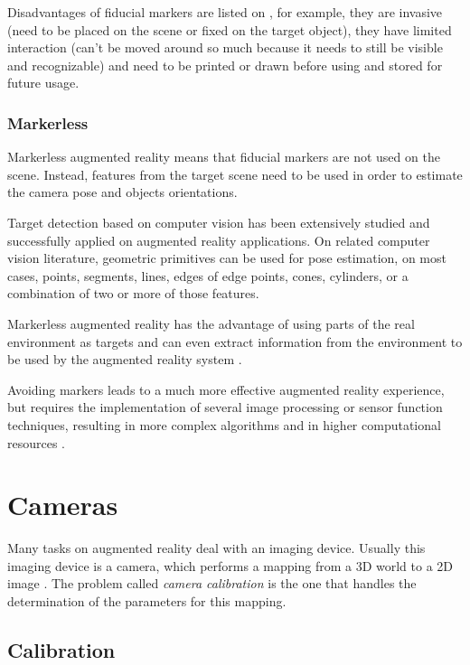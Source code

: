 \documentclass[msc, a4paper, classic, en]{ufbathesis}
\begin{document}
Disadvantages of fiducial markers are listed on \cite{dolz}, for example, they are invasive (need to be placed on the scene or fixed on the target object), they have limited interaction (can't be moved around so much because it needs to still be visible and recognizable) and need to be printed or drawn before using and stored for future usage.

\subsubsection{Markerless}

Markerless augmented reality means that fiducial markers are not used on the scene. Instead, features from the target scene need to be used in order to estimate the camera pose and objects orientations.

Target detection based on computer vision has been extensively studied and successfully applied on augmented reality applications. On related computer vision literature, geometric primitives can be used for pose estimation, on most cases, points, segments, lines, edges of edge points, cones, cylinders, or a combination of two or more of those features.

Markerless augmented reality has the advantage of using parts of the real environment as targets and can even extract information from the environment to be used by the augmented reality system \cite{dolz}.

Avoiding markers leads to a much more effective augmented reality experience, but requires the implementation of several image processing or sensor function techniques, resulting in more complex algorithms and in higher computational resources \cite{shumaker2011virtual}.

\section{Cameras}

Many tasks on augmented reality deal with an imaging device. Usually this imaging device is a camera, which performs a mapping from a 3D world to a 2D image \cite{hanning2011high}. The problem called \textit{camera calibration} is the one that handles the determination of the parameters for this mapping.

\subsection{Calibration}
\end{document}

